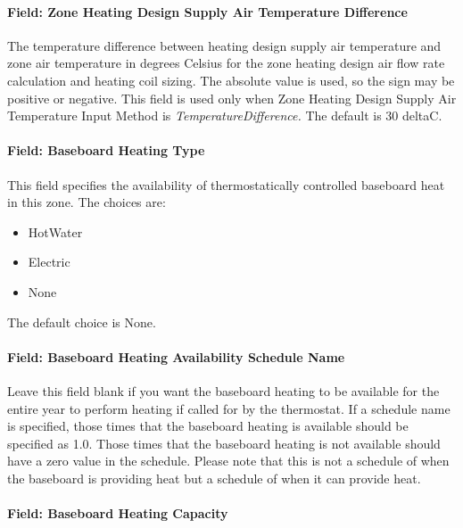 \paragraph{Field: Zone Heating Design Supply Air Temperature Difference}\label{field-zone-heating-design-supply-air-temperature-difference-4}

The temperature difference between heating design supply air temperature and zone air temperature in degrees Celsius for the zone heating design air flow rate calculation and heating coil sizing. The absolute value is used, so the sign may be positive or negative. This field is used only when Zone Heating Design Supply Air Temperature Input Method is \emph{TemperatureDifference.} The default is 30 deltaC.

\paragraph{Field: Baseboard Heating Type}\label{field-baseboard-heating-type-5}

This field specifies the availability of thermostatically controlled baseboard heat in this zone. The choices are:

\begin{itemize}
\item
  HotWater
\item
  Electric
\item
  None
\end{itemize}

The default choice is None.

\paragraph{Field: Baseboard Heating Availability Schedule Name}\label{field-baseboard-heating-availability-schedule-name-5}

Leave this field blank if you want the baseboard heating to be available for the entire year to perform heating if called for by the thermostat. If a schedule name is specified, those times that the baseboard heating is available should be specified as 1.0. Those times that the baseboard heating is not available should have a zero value in the schedule. Please note that this is not a schedule of when the baseboard is providing heat but a schedule of when it can provide heat.

\paragraph{Field: Baseboard Heating Capacity}\label{field-baseboard-heating-capacity-5}

